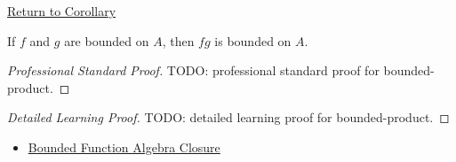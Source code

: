 \newpage
{}
\label{prf:bounded-product}

\begin{remark*}[Return]
\hyperref[cor:bounded-product]{Return to Corollary}
\end{remark*}

\begin{corollary*}
If \(f\) and \(g\) are bounded on \(A\), then \(fg\) is bounded on \(A\).
\end{corollary*}

\begin{proof}[Professional Standard Proof]
\LRAProofBodyStart
TODO: professional standard proof for bounded-product.
\end{proof}

\begin{proof}[Detailed Learning Proof]
\LRAProofBodyStart
TODO: detailed learning proof for bounded-product.
\end{proof}

\begin{remark*}
\end{remark*}

\begin{dependencies}
\begin{itemize}
  \item \hyperref[thm:bounded-function-algebra-closure]{Bounded Function Algebra Closure}
\end{itemize}
\end{dependencies}

\clearpage

